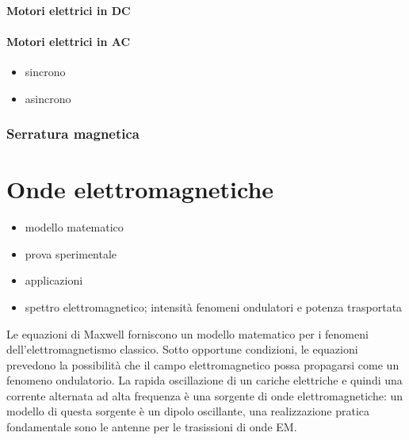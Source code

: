 \documentclass[letterpaper,10pt,italian]{jupyterBook}
\begin{document}
\subsubsection{Motori elettrici in DC}
\label{\detokenize{ch/electromagnetism/electric-machines:motori-elettrici-in-dc}}

\subsubsection{Motori elettrici in AC}
\label{\detokenize{ch/electromagnetism/electric-machines:motori-elettrici-in-ac}}\begin{itemize}
\item {} 
\sphinxAtStartPar
sincrono

\item {} 
\sphinxAtStartPar
asincrono

\end{itemize}


\subsection{Serratura magnetica}
\label{\detokenize{ch/electromagnetism/electric-machines:serratura-magnetica}}
\sphinxstepscope


\chapter{Onde elettromagnetiche}
\label{\detokenize{ch/electromagnetism/em-waves:onde-elettromagnetiche}}\label{\detokenize{ch/electromagnetism/em-waves:physics-hs-electromagnetism-em-waves}}\label{\detokenize{ch/electromagnetism/em-waves::doc}}\begin{itemize}
\item {} 
\sphinxAtStartPar
modello matematico

\item {} 
\sphinxAtStartPar
prova sperimentale

\item {} 
\sphinxAtStartPar
applicazioni

\item {} 
\sphinxAtStartPar
spettro elettromagnetico; intensità fenomeni ondulatori e potenza trasportata

\end{itemize}

\sphinxAtStartPar
{} Le equazioni di Maxwell forniscono un modello matematico per i fenomeni dell’elettromagnetismo classico. Sotto opportune condizioni, le equazioni prevedono la possibilità che il campo elettromagnetico possa propagarsi come un fenomeno ondulatorio. La rapida oscillazione di un cariche elettriche \sphinxhyphen{} e quindi una corrente alternata ad alta frequenza \sphinxhyphen{} è una sorgente di onde elettromagnetiche: un modello di questa sorgente è un dipolo oscillante, una realizzazione pratica fondamentale sono le antenne per le trasissioni di onde EM.
\end{document}

